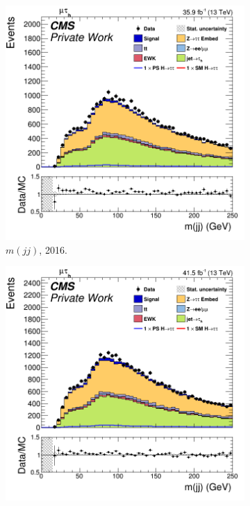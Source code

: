 \begin{figure}
  \begin{subfigure}[b]{0.33\linewidth}
    \centering
    \includegraphics[width=\linewidth]{Chapitre7/Images/CtrlPlots/2016/DijetMass.png} 
    \caption{$m(jj)$, 2016.} 
    \vspace{0.5ex}
  \end{subfigure}%
  \begin{subfigure}[b]{0.33\linewidth}
    \centering
    \includegraphics[width=\linewidth]{Chapitre7/Images/CtrlPlots/2017/DijetMass.png} 

\end{subfigure}
\end{figure}
